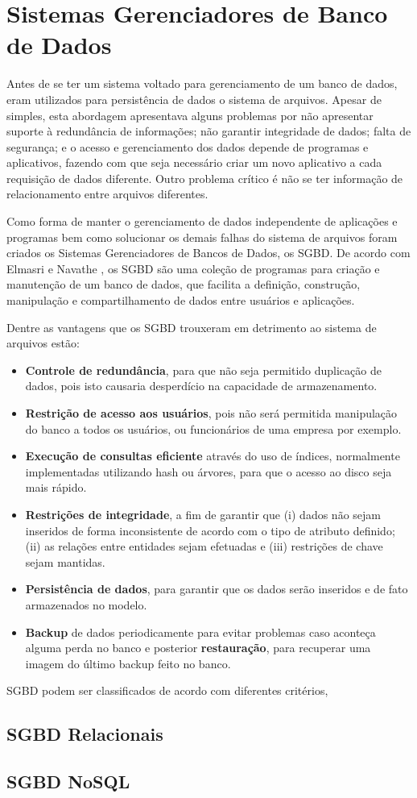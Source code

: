 \chapter{Sistemas Gerenciadores de Banco de Dados}
\label{sgbd}

Antes de se ter um sistema voltado para gerenciamento de um banco de dados, eram utilizados para persistência de dados o sistema de arquivos. 
Apesar de simples, esta abordagem apresentava alguns problemas por não apresentar suporte à redundância de informações; não garantir integridade de dados; 
falta de segurança; e o acesso e gerenciamento dos dados depende de programas e aplicativos, fazendo com que seja necessário criar um novo aplicativo a 
cada requisição de dados diferente. Outro problema crítico é não se ter informação de relacionamento entre arquivos diferentes.

Como forma de manter o gerenciamento de dados independente de aplicações e programas bem como solucionar os demais falhas do sistema de arquivos 
foram criados os Sistemas Gerenciadores de Bancos de Dados, os SGBD.  De acordo com Elmasri e Navathe \cite{navathe2011banco}, os SGBD são uma coleção de programas para 
criação e manutenção de um banco de dados, que facilita a definição, construção, manipulação e compartilhamento de dados entre usuários e aplicações.

Dentre as vantagens que os SGBD trouxeram em detrimento ao sistema de arquivos estão:

\begin{itemize}
    \item{\textbf{Controle de redundância}}, para que não seja permitido duplicação de dados, pois isto causaria desperdício na capacidade de armazenamento.
    \item{\textbf{Restrição de acesso aos usuários}}, pois não será permitida manipulação do banco a todos os usuários, ou funcionários de uma empresa por exemplo.
    \item{\textbf{Execução de consultas eficiente}} através do uso de índices, normalmente implementadas utilizando hash ou árvores, para que o acesso ao disco seja mais rápido.
    \item{\textbf{Restrições de integridade}}, a fim de garantir que (i) dados não sejam inseridos de forma inconsistente de acordo com o tipo de atributo definido; 
    (ii) as relações entre entidades sejam efetuadas e (iii) restrições de chave sejam mantidas.
    \item{\textbf{Persistência de dados}}, para garantir que os dados serão inseridos e de fato armazenados no modelo.
    \item{\textbf{Backup}} de dados periodicamente para evitar problemas caso aconteça alguma perda no banco e posterior \textbf{restauração}, para recuperar uma imagem do último backup feito no banco.
\end{itemize}

SGBD podem ser classificados de acordo com diferentes critérios, 

\section{SGBD Relacionais}



\section{SGBD NoSQL}
